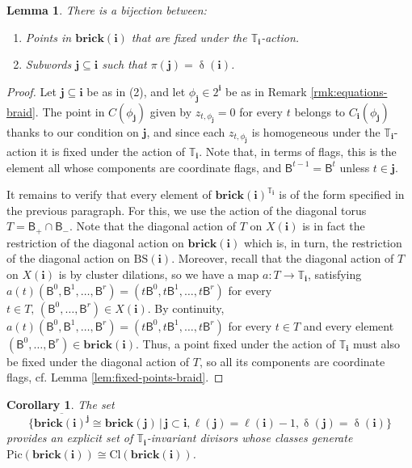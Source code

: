 \documentclass[a4paper, 11pt]{amsart}
\newcommand{\brick}{\mathbf{brick}}
\newcommand{\borel}{\mathsf{B}}
\newcommand{\flag}[1]{\mathsf{B}^{#1}}
\newcommand{\word}[1]{\mathbf{#1}}
\DeclareMathOperator{\dem}{\delta}
\newcommand{\Pic}{\mathrm{Pic}}
\newcommand{\Cl}{\mathrm{Cl}}
\newcommand{\BS}{\mathrm{BS}}
\newcommand{\dil}[1]{\mathbb{T}_{#1}}
\newtheorem{corollary}[theorem]{Corollary}%
\newtheorem{lemma}[theorem]{Lemma}%
\theoremstyle{definition}
\begin{document}
\begin{lemma}
\label{lem:fixed_points}
    There is a bijection between:
    \begin{enumerate}
        \item Points in $\brick(\word{i})$ that are fixed under the $\dil{\word{i}}$-action.
        \item Subwords $\word{j} \subseteq \word{i}$ such that $\pi(\word{j}) = \dem(\word{i})$. 
    \end{enumerate}
\end{lemma}
\begin{proof}
Let $\word{j} \subseteq \word{i}$ be as in (2), and let $\phi_{\word{j}} \in 2^{\word{i}}$ be as in Remark \ref{rmk:equations-braid}. The point in $C(\phi_{\word{j}})$ given by $z_{t, \phi_{\word{j}}} = 0$ for every $t$ belongs to $C_{\word{i}}(\phi_{\word{j}})$ thanks to our condition on $\word{j}$, and since each $z_{t, \phi_{\word{j}}}$ is homogeneous under the $\dil{\word{i}}$-action it is fixed under the action of $\dil{\word{i}}$. Note that, in terms of flags, this is the element all whose components are coordinate flags, and $\flag{t-1} = \flag{t}$ unless $t \in \word{j}$. 

It remains to verify that every element of $\brick(\word{i})^{\dil{\word{i}}}$ is of the form specified in the previous paragraph. For this, we use the action of the diagonal torus $T = \borel_{+} \cap \borel_{-}$. Note that the diagonal action of $T$ on $X(\word{i})$ is in fact the restriction of the diagonal action on $\brick(\word{i})$ which is, in turn, the restriction of the diagonal action on $\BS(\word{i})$. Moreover, recall that the diagonal action of $T$ on $X(\word{i})$ is by cluster dilations, so we have a map $a: T \to \dil{\word{i}}$, satisfying $a(t)(\flag{0}, \flag{1}, \dots, \flag{r}) = (t\flag{0}, t\flag{1}, \dots, t\flag{r})$ for every  $t \in T, \, (\flag{0}, \dots, \flag{r}) \in X(\word{i})$. By continuity, $a(t)(\flag{0}, \flag{1}, \dots, \flag{r}) = (t\flag{0}, t\flag{1}, \dots, t\flag{r})$ for every $t \in T$ and every element $(\flag{0}, \dots, \flag{r}) \in \brick(\word{i})$. Thus, a point fixed under the action of $\dil{\word{i}}$ must also be fixed under the diagonal action of $T$, so all its components are coordinate flags, cf. Lemma \ref{lem:fixed-points-braid}. 
\end{proof}

\begin{corollary}
\label{cor:invariant_divisors}
The set  
\begin{equation}
\label{eq:invariant_divisors}
\{ \overline{\brick(\word{i})^{\word{j}}} \cong \brick(\word{j}) \, | \, \word{j} \subset \word{i}, \ell(\word{j}) = \ell(\word{i}) - 1, \dem(\word{j}) = \dem(\word{i})\}
\end{equation}
provides an explicit set of $\dil{\word{i}}$-invariant divisors whose classes generate $\Pic(\brick(\word{i})) \cong \Cl(\brick(\word{i}))$.
\end{corollary}
\end{document}

